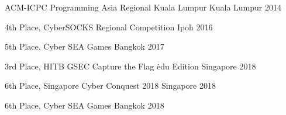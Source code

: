 



\begin{cvhonors}

  \cvhonor
    {}
    {ACM-ICPC Programming Asia Regional Kuala Lumpur} 
    {Kuala Lumpur} 
    {2014} 

  \cvhonor
    {4th Place,} 
    {CyberSOCKS Regional Competition} 
    {Ipoh} 
    {2016} 

  \cvhonor
    {5th Place,} 
    {Cyber SEA Games} 
    {Bangkok} 
    {2017} 

  \cvhonor
    {3rd Place,} 
    {HITB GSEC Capture the Flag \.edu Edition} 
    {Singapore} 
    {2018} 

  \cvhonor
    {6th Place,} 
    {Singapore Cyber Conquest 2018} 
    {Singapore} 
    {2018} 

  \cvhonor
  {6th Place,} 
  {Cyber SEA Games} 
  {Bangkok} 
  {2018} 

\end{cvhonors}





